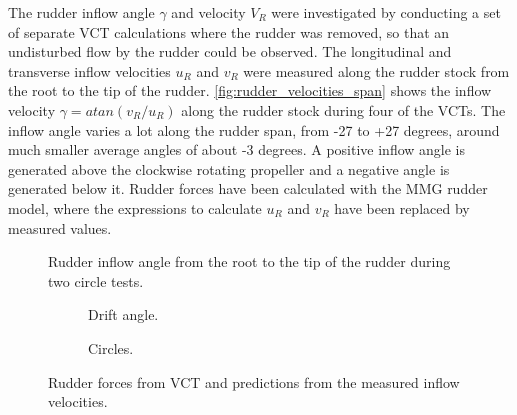 The rudder inflow angle $\gamma$ and velocity $V_R$ were investigated by conducting a set of separate VCT calculations where the rudder was removed, so that an undisturbed flow by the rudder could be observed. The longitudinal and transverse inflow velocities $u_R$ and $v_R$ were measured along the rudder stock from the root to the tip of the rudder. \autoref{fig:rudder_velocities_span} shows the inflow velocity $\gamma=atan(v_R/u_R)$ along the rudder stock during four of the VCTs. The inflow angle varies a lot along the rudder span, from -27 to +27 degrees, around much smaller average angles of about -3 degrees. A positive inflow angle is generated above the clockwise rotating propeller and a negative angle is generated below it.
Rudder forces have been calculated with the MMG rudder model, where the expressions to calculate $u_R$ and $v_R$ have been replaced by measured values. 
\begin{figure}[h]
    \centering 
    
    \caption{Rudder inflow angle from the root to the tip of the rudder during two circle tests.}
     \label{fig:rudder_velocities_span}
\end{figure}
\begin{figure}[h]
     \centering
     \begin{subfigure}[b]{\textwidth}
         \centering
         
        \caption{Drift angle.}
        \label{fig:inflow_to_force_drift_angle}
     \end{subfigure}
     \vfill
     \begin{subfigure}[b]{\textwidth}
         
        \caption{Circles.}
        \label{fig:inflow_to_force_circle}
     \end{subfigure}
        \caption{Rudder forces from VCT and predictions from the measured inflow velocities.}
        \label{fig:inflow_to_rudder_force}
\end{figure}
